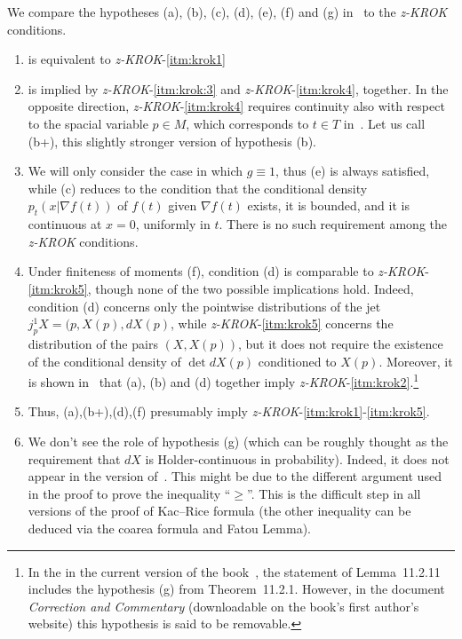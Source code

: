 \documentclass[AHL, Unicode, longabstracts, published]{cedram}
\newcommand{\zkrok}{\emph{z-KROK}\xspace}
\newcommand*{\alphenumi}{\renewcommand*{\theenumi}{\alph{enumi}}}
\begin{document}
We compare the hypotheses (a), (b), (c), (d), (e), (f) and (g) in~\cite[Theorem~11.2.1]{AdlerTaylor} to the \zkrok conditions.
\begin{enumerate}\alphenumi
\item is equivalent to \zkrok-\ref{itm:krok1}
\item is implied by \zkrok-\ref{itm:krok:3} and \zkrok-\ref{itm:krok4}, together. In the opposite direction, \zkrok-\ref{itm:krok4} requires continuity also with respect to the spacial variable $p\in M$, which corresponds to $t\in T$ in~\cite{AdlerTaylor}. Let us call (b+), this slightly stronger version of hypothesis (b).
\item We will only consider the case in which $g\equiv 1$, thus (e) is always satisfied, while (c) reduces to the condition that the conditional density $p_t(x|\nabla f(t))$ of $f(t)$ given $\nabla f(t)$ exists, it is bounded, and it is continuous at $x=0$, uniformly in $t$. There is no such requirement among the \zkrok conditions.
\item Under finiteness of moments (f), condition (d) is comparable to \zkrok-\ref{itm:krok5}, though none of the two possible implications hold. Indeed, condition (d) concerns only the pointwise distributions of the jet $j^1_pX=(p,X(p),dX(p)$, while \zkrok-\ref{itm:krok5} concerns the distribution of the pairs $(X,X(p))$, but it does not require the existence of the conditional density of $\det dX(p)$ conditioned to $X(p)$. Moreover, it is shown in~\cite[Lemma~11.2.11]{AdlerTaylor} that (a), (b) and (d) together imply \zkrok-\ref{itm:krok2}.\footnote{In the in the current version of the book~\cite{AdlerTaylor}, the statement of Lemma~11.2.11 includes the hypothesis (g) from Theorem~11.2.1. However, in the document \emph{Correction and Commentary} (downloadable on the book's first author's website) this hypothesis is said to be removable. }
\item Thus, (a),(b+),(d),(f) presumably imply \zkrok-\ref{itm:krok1}-\ref{itm:krok5}.
\item We don't see the role of hypothesis (g) (which can be roughly thought as the requirement that $dX$ is Holder-continuous in probability). Indeed, it does not appear in the version of~\cite{AzaisWscheborbook}. This might be due to the different argument used in the proof to prove the inequality ``$\ge$''. This is the difficult step in all versions of the proof of Kac--Rice formula (the other inequality can be deduced via the coarea formula and Fatou Lemma).
\end{enumerate}
\end{document}
